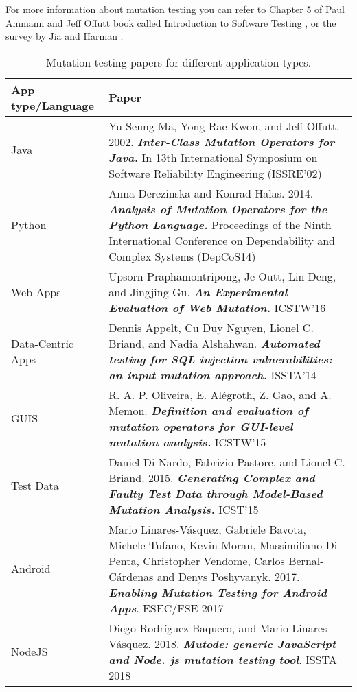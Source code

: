 For more information about mutation testing you can refer to Chapter 5 of Paul Ammann and Jeff Offutt book called Introduction to Software Testing \cite{ammann2016introduction}, or the survey by Jia and Harman \cite{Jia:TSE11}.

\begin{table}[H]
	\centering
		\caption{Mutation testing papers for different application types.}
	\label{table:mtpfsc}
	\begin{tabular}{|p{3cm} | p{10cm}|} 
		\hline
		App type/Language & Paper \\ [0.5ex] 
		\hline\hline
		Java & Yu-Seung Ma, Yong Rae Kwon, and Jeff  Offutt. 2002. \textbf{\textit{Inter-Class Mutation Operators for Java.}} In 13th International Symposium on Software Reliability Engineering (ISSRE’02) \\
		\hline\hline
		Python & Anna Derezinska and Konrad Halas. 2014. \textbf{\textit{Analysis of Mutation Operators for the Python Language.}} Proceedings of the Ninth International Conference on Dependability and Complex Systems (DepCoS14) \\ \hline\hline
		Web Apps & Upsorn Praphamontripong, Je  Outt, Lin Deng, and Jingjing Gu. \textbf{\textit{An Experimental Evaluation of Web Mutation.}} ICSTW’16 \\ \hline\hline
		Data-Centric Apps & Dennis Appelt, Cu Duy Nguyen, Lionel C. Briand, and Nadia Alshahwan.\textit{ \textbf{Automated testing for SQL injection vulnerabilities: an input mutation approach.}} ISSTA’14 \\ \hline\hline
		GUIS & R. A. P. Oliveira, E. Alégroth, Z. Gao, and A. Memon. \textbf{\textit{Definition and evaluation of mutation operators for GUI-level mutation analysis.}} ICSTW’15 \\ \hline\hline
		Test Data & Daniel Di Nardo, Fabrizio Pastore, and Lionel C. Briand. 2015. \textbf{\textit{Generating Complex and Faulty Test Data through Model-Based Mutation Analysis.}} ICST’15 \\
		\hline\hline
		Android & Mario Linares-Vásquez, Gabriele Bavota, Michele Tufano, Kevin Moran, Massimiliano Di Penta, Christopher Vendome, Carlos Bernal-Cárdenas and Denys Poshyvanyk. 2017. \textit{\textbf{Enabling Mutation Testing for Android Apps}}. ESEC/FSE 2017 \\
		\hline\hline
		NodeJS & Diego Rodríguez-Baquero, and Mario Linares-Vásquez. 2018. \textit{\textbf{Mutode: generic JavaScript and Node. js mutation testing tool}}. ISSTA 2018 \\
		\hline
	\end{tabular}
\end{table}


